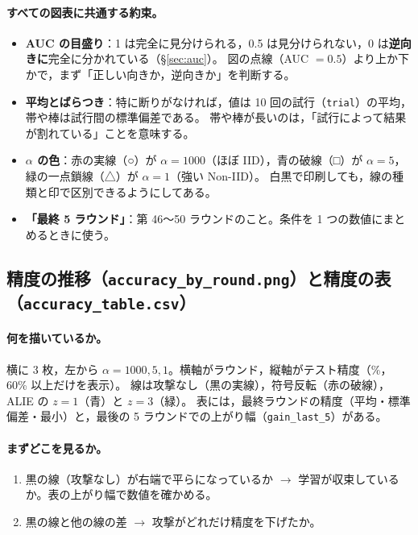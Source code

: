 \documentclass[a4j, dvipdfmx]{jsarticle}  %
\begin{document}
\paragraph{すべての図表に共通する約束。}
\begin{itemize}
  \item \textbf{AUC の目盛り}：1 は完全に見分けられる，0.5 は見分けられない，0 は\textbf{逆向きに}完全に分かれている（\S\ref{sec:auc}）。
        図の点線（AUC $= 0.5$）より上か下かで，まず「正しい向きか，逆向きか」を判断する。
  \item \textbf{平均とばらつき}：特に断りがなければ，値は 10 回の試行（\texttt{trial}）の平均，帯や棒は試行間の標準偏差である。
        帯や棒が長いのは，「試行によって結果が割れている」ことを意味する。
  \item \textbf{$\alpha$ の色}：赤の実線（○）が $\alpha = 1000$（ほぼ IID），青の破線（□）が $\alpha = 5$，緑の一点鎖線（△）が $\alpha = 1$（強い Non-IID）。
        白黒で印刷しても，線の種類と印で区別できるようにしてある。
  \item \textbf{「最終 5 ラウンド」}：第 46〜50 ラウンドのこと。条件を 1 つの数値にまとめるときに使う。
\end{itemize}

\subsection{精度の推移（\texttt{accuracy\_by\_round.png}）と精度の表（\texttt{accuracy\_table.csv}）}

\paragraph{何を描いているか。}
横に 3 枚，左から $\alpha = 1000, 5, 1$。横軸がラウンド，縦軸がテスト精度（\%，60\% 以上だけを表示）。
線は攻撃なし（黒の実線），符号反転（赤の破線），ALIE の $z = 1$（青）と $z = 3$（緑）。
表には，最終ラウンドの精度（平均・標準偏差・最小）と，最後の 5 ラウンドでの上がり幅（\texttt{gain\_last\_5}）がある。

\paragraph{まずどこを見るか。}
\begin{enumerate}
  \item 黒の線（攻撃なし）が右端で平らになっているか $\rightarrow$ 学習が収束しているか。表の上がり幅で数値を確かめる。
  \item 黒の線と他の線の差 $\rightarrow$ 攻撃がどれだけ精度を下げたか。
\end{enumerate}
\end{document}
